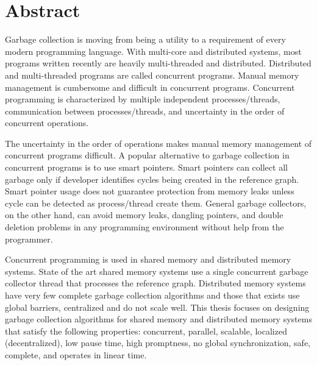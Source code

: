 \chapter*{Abstract}
\label{ch:abstract}

Garbage collection is moving from being a utility to a requirement of every modern programming language. 
With multi-core and distributed systems, most programs written recently are heavily multi-threaded and distributed. Distributed and multi-threaded programs are called concurrent programs. Manual memory management is cumbersome and difficult in concurrent programs.  Concurrent programming is characterized by multiple independent processes/threads, communication between processes/threads, and uncertainty in the order of concurrent operations.

The uncertainty in the order of operations makes manual memory management of concurrent programs difficult. 
A popular alternative to garbage collection in concurrent programs is to use smart pointers.
Smart pointers can collect all garbage only if developer identifies cycles being created in the reference graph. 
Smart pointer usage does not guarantee protection from memory leaks unless cycle can be detected as process/thread create them. General garbage collectors, on the other hand, can avoid memory leaks, dangling pointers, and double deletion problems in any programming environment without help from the programmer.

Concurrent programming is used in shared memory and distributed memory systems. State of the art shared memory systems use a single concurrent garbage collector thread that processes the reference graph. Distributed memory systems have very few complete garbage collection algorithms and those that exists use global barriers, centralized and do not scale well. This thesis  focuses on designing garbage collection algorithms for shared memory and distributed memory systems that satisfy the following properties: concurrent, parallel, scalable, localized (decentralized), low pause time, high promptness, no global synchronization, safe, complete, and operates in linear time.

